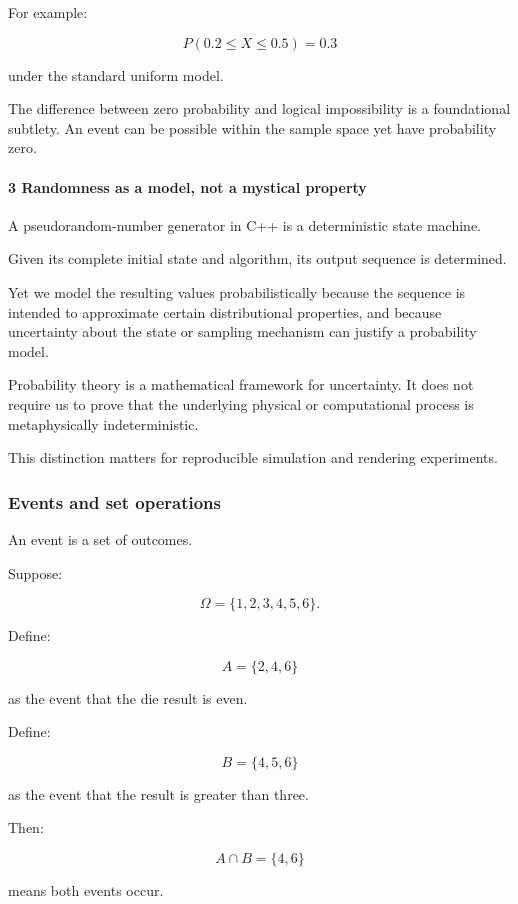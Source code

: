 For example:

\[
 P(0.2\le X\le0.5)=0.3
\]

under the standard uniform model.

The difference between zero probability and logical impossibility is a foundational subtlety. An event can be possible within the sample space yet have probability zero.

\paragraph{3 Randomness as a model, not a mystical property}\label{randomness-as-a-model-not-a-mystical-property}

A pseudorandom-number generator in C++ is a deterministic state machine.

Given its complete initial state and algorithm, its output sequence is determined.

Yet we model the resulting values probabilistically because the sequence is intended to approximate certain distributional properties, and because uncertainty about the state or sampling mechanism can justify a probability model.

Probability theory is a mathematical framework for uncertainty. It does not require us to prove that the underlying physical or computational process is metaphysically indeterministic.

This distinction matters for reproducible simulation and rendering experiments.

\subsubsection{Events and set operations}\label{events-and-set-operations}

An event is a set of outcomes.

Suppose:

\[
 \Omega=\{1,2,3,4,5,6\}.
\]

Define:

\[
 A=\{2,4,6\}
\]

as the event that the die result is even.

Define:

\[
 B=\{4,5,6\}
\]

as the event that the result is greater than three.

Then:

\[
 A\cap B=\{4,6\}
\]

means both events occur.

